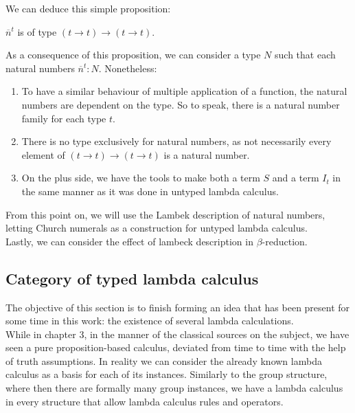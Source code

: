 \begin{definition}
\begin{definition}
\end{definition}
We can deduce this simple proposition:
\begin{proposition}
  $\overline n^t$ is of type $(t\to t)\to(t\to t)$.
\end{proposition}

As a consequence of this proposition, we can consider a type $N$ such that each natural numbers $\overline n^t:N$. Nonetheless:
\begin{enumerate}

\item To have a similar behaviour of multiple application of a function, the natural numbers are dependent on the type. So to speak, there is a natural number family for each type $t$.
\item There is no type exclusively for natural numbers, as not necessarily every element of $(t\to t)\to(t\to t)$ is a natural number.
\item On the plus side, we have the tools to make both a term $S$ and a term $I_t$ in the same manner as it was done in untyped lambda calculus. \\
\end{enumerate}
From this point on, we will use the Lambek description of natural numbers, letting Church numerals as a construction for untyped lambda calculus.\\

Lastly, we can consider the effect of lambeck description in $\beta$-reduction.

\subsection{Category of typed lambda calculus}

The objective of this section is to finish forming an idea that has been present for some time in this work: the existence of several lambda calculations. \\

While in chapter 3, in the manner of the classical sources on the subject, we have seen a pure proposition-based calculus, deviated from time to time with the help of truth assumptions. In reality we can consider the already known lambda calculus as a basis for each of its instances. Similarly to the group structure, where then there are formally many group instances, we have a lambda calculus in every structure that allow lambda calculus rules and operators.\\


\end{definition}
